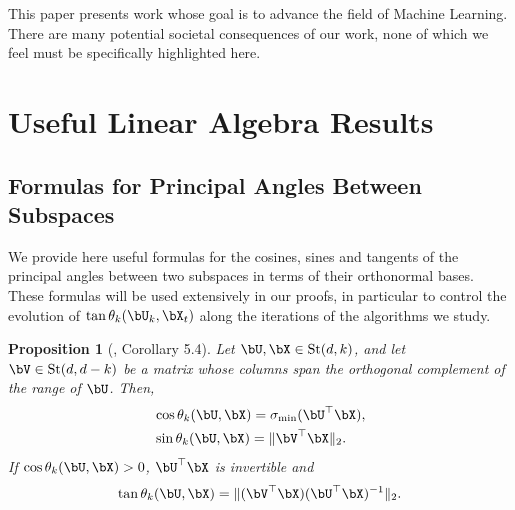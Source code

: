 \documentclass{article}
\theoremstyle{plain}
\newtheorem{proposition}[theorem]{Proposition}
\theoremstyle{definition}
\theoremstyle{remark}
\begin{document}
This paper presents work whose goal is to advance the field of Machine Learning. There are many potential societal consequences of our work, none of which we feel must be specifically highlighted here.




\newpage
\appendix
{}

\onecolumn

\section{Useful Linear Algebra Results}

\subsection{Formulas for Principal Angles Between Subspaces}

We provide here useful formulas for the cosines, sines and tangents of the principal angles between two subspaces in terms of their orthonormal bases. These formulas will be used extensively in our proofs, in particular to control the evolution of $\tan\theta_k(\bU_k, \bX_t)$ along the iterations of the algorithms we study.

\begin{proposition}[\citet{stewart90}, Corollary 5.4]\label{prop:tantheta}
    Let $\bU, \bX \in \mathrm{St}(d,k)$, and let $\bV \in \mathrm{St}(d,d-k)$ be a matrix whose columns span the orthogonal complement of the range of $\bU$.  Then,
  \begin{align*}
    & \cos\theta_k(\bU, \bX) = \sigma_{\min}(\bU^\top \bX), \\
    & \sin\theta_k(\bU, \bX) = \Vert\bV^\top \bX\Vert_2.
  \end{align*}
  If $\cos\theta_k(\bU, \bX) > 0$, $\bU^\top \bX$ is invertible and
  \begin{align*}
    \tan\theta_k(\bU, \bX) = \Vert (\bV^\top \bX) (\bU^\top \bX)^{-1} \Vert_2.
  \end{align*}
\end{proposition}
\end{document}
